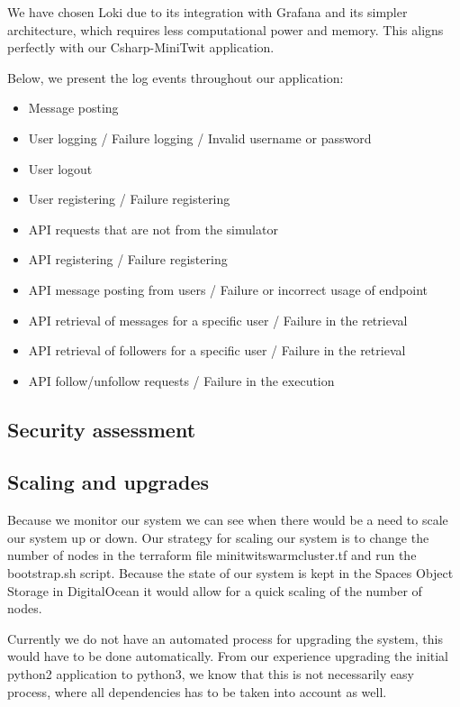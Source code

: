 We have chosen Loki due to its integration with Grafana and its simpler architecture, which requires less computational power and memory. This aligns perfectly with our Csharp-MiniTwit application. \newline

Below, we present the log events throughout our application:
\begin{itemize}
    \item Message posting
    \item User logging / Failure logging / Invalid username or password
    \item User logout
    \item User registering / Failure registering
    \item API requests that are not from the simulator
    \item API registering / Failure registering
    \item API message posting from users / Failure or incorrect usage of endpoint
    \item API retrieval of messages for a specific user / Failure in the retrieval
    \item API retrieval of followers for a specific user / Failure in the retrieval
    \item API follow/unfollow requests / Failure in the execution
    
\end{itemize}




\subsection{Security assessment}


\subsection{Scaling and upgrades}
Because we monitor our system we can see when there would be a need to scale our system up or down. Our strategy for scaling our system is to change the number of nodes in the terraform file minitwit\textunderscore swarm\textunderscore cluster.tf and run the bootstrap.sh script. Because the state of our system is kept in the Spaces Object Storage in DigitalOcean it would allow for a quick scaling of the number of nodes. 

Currently we do not have an automated process for upgrading the system, this would have to be done automatically. From our experience upgrading the initial python2 application to python3, we know that this is not necessarily easy process, where all dependencies has to be taken into account as well. 


